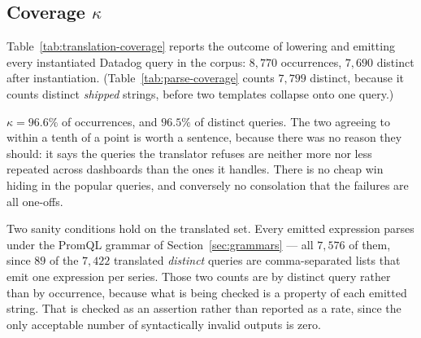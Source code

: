 \subsection{Coverage \texorpdfstring{$\kappa$}{kappa}}

Table~\ref{tab:translation-coverage} reports the outcome of lowering and emitting every
instantiated Datadog query in the corpus: $8{,}770$ occurrences, $7{,}690$ distinct after
instantiation. (Table~\ref{tab:parse-coverage} counts $7{,}799$ distinct, because it
counts distinct \emph{shipped} strings, before two templates collapse onto one query.)

\begin{table}[htbp]\centering\footnotesize

\caption{Translation outcomes over the Datadog corpus. Every $\bot$ carries a gap code
and appears in Table~\ref{tab:gap-catalogue}; the unparsed row is kept in the denominator
so that $\kappa$ is a statement about the corpus rather than about the parsable part of
it.}
\label{tab:translation-coverage}
\end{table}

\noindent
$\kappa = 96.6\%$ of occurrences, and $96.5\%$ of distinct queries. The two agreeing to
within a tenth of a point is worth a sentence, because there was no reason they should:
it says the queries the translator refuses are neither more nor less repeated across
dashboards than the ones it handles. There is no cheap win hiding in the popular queries, and conversely no
consolation that the failures are all one-offs.

Two sanity conditions hold on the translated set. Every emitted expression parses under
the PromQL grammar of Section~\ref{sec:grammars} --- all $7{,}576$ of them, since $89$
of the $7{,}422$ translated \emph{distinct} queries are comma-separated lists that emit
one expression per series. Those two counts are by distinct query rather than by
occurrence, because what is being checked is a property of each emitted string. That is checked as an assertion rather than reported as a rate, since the
only acceptable number of syntactically invalid outputs is zero.

